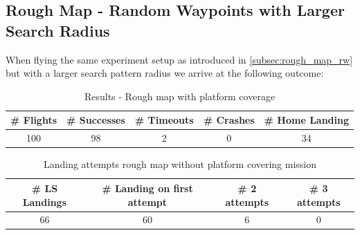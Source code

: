 
\subsection{Rough Map - Random Waypoints with Larger Search Radius}

    When flying the same experiment setup as introduced in \cref{subsec:rough_map_rw} but with a larger search pattern radius we arrive at the following outcome:

    \begin{table}[h]
        \begin{center}
         \caption{Results - Rough map with platform coverage}\vspace{1ex}
         \label{tab:result_rough_rand_lr}
         \begin{tabular}{|c|c|c|c|c|}
         \hline
         \# Flights & \# Successes & \# Timeouts & \# Crashes & \# Home Landing\\ \hline \hline
         100 & 98 & 2 & 0 & 34 \\
         \hline
         \end{tabular}
        \end{center}
    \end{table}

    \begin{table}[h]
        \begin{center}
         \caption{Landing attempts rough map without platform covering mission}\vspace{1ex}
         \label{tab:land_nums_rough_rand_lr}
         \begin{tabular}{|c|c|c|c|}
         \hline
         \# LS Landings & \# Landing on first attempt & \# 2 attempts & \# 3 attempts\\ \hline \hline
         66 & 60 & 6 & 0 \\
         \hline
         \end{tabular}
        \end{center}
    \end{table}

